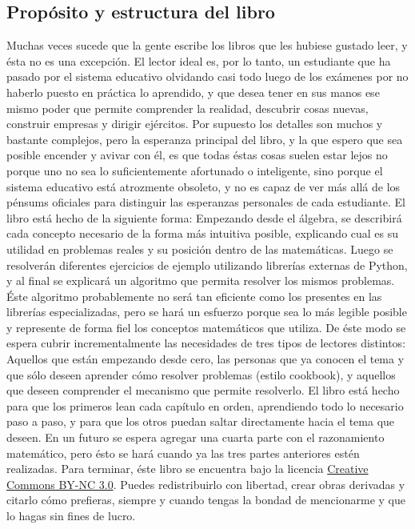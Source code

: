 \documentclass{article}
\begin{document}
\subsection{Propósito y estructura del libro}\label{estructura}
\newline
Muchas veces sucede que la gente escribe los libros que les hubiese gustado leer,
y ésta no es una excepción. El lector ideal es, por lo tanto, un estudiante que
ha pasado por el sistema educativo olvidando casi todo luego de los exámenes por
no haberlo puesto en práctica lo aprendido, y que desea tener en sus manos ese mismo poder que permite
comprender la realidad, descubrir cosas nuevas, construir empresas
y dirigir ejércitos. Por supuesto los detalles son muchos y bastante complejos,
pero la esperanza principal del libro, y la que espero que sea posible encender
y avivar con él, es que todas éstas cosas suelen estar lejos no porque uno no sea
lo suficientemente afortunado o inteligente, sino porque el sistema educativo está
atrozmente obsoleto, y no es capaz de ver más allá de los pénsums oficiales para
distinguir las esperanzas personales de cada estudiante.
\newline\newline
El libro está hecho de la siguiente forma: Empezando desde el álgebra, se describirá
cada concepto necesario de la forma más intuitiva posible, explicando cual es su utilidad
en problemas reales y su posición dentro de las matemáticas. Luego se resolverán 
diferentes ejercicios de ejemplo utilizando librerías externas de Python, y al 
final se explicará un algoritmo 
que permita resolver los mismos problemas. Éste algoritmo probablemente no será
tan eficiente como los presentes en las librerías especializadas, pero se hará
un esfuerzo porque sea lo más legible posible y represente de forma fiel los
conceptos matemáticos que utiliza. De éste modo se espera
cubrir incrementalmente las necesidades de tres tipos de lectores distintos: 
Aquellos que están empezando desde cero, las personas que ya conocen el tema y 
que sólo deseen aprender cómo resolver problemas (estilo cookbook), y aquellos
que deseen comprender el mecanismo que permite resolverlo. El libro está hecho
para que los primeros lean cada capítulo en orden, aprendiendo todo lo necesario
paso a paso, y para que los otros puedan saltar directamente hacia el tema que
deseen. En un futuro se 
espera agregar una cuarta parte con el razonamiento matemático, pero ésto se
hará cuando ya las tres partes anteriores estén realizadas.
\newline\newline
Para terminar, éste libro se encuentra bajo la licencia \href{https://creativecommons.org/licenses/by-nc/3.0/}{Creative Commons BY-NC 3.0}. Puedes redistribuirlo con libertad, crear obras derivadas y citarlo cómo prefieras, siempre y cuando tengas la bondad de mencionarme y que lo hagas sin fines de lucro.
\end{document}

